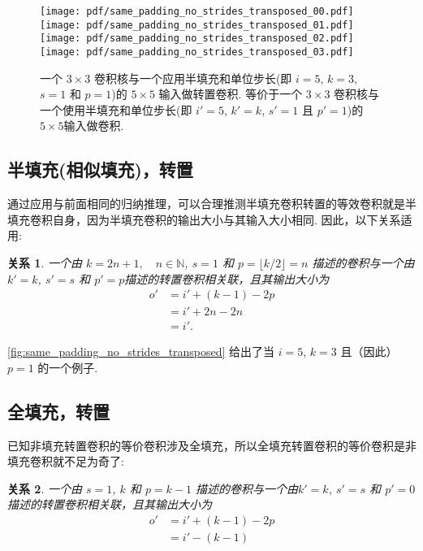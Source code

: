 \documentclass[notitlepage]{ctexrep}
\newtheorem{relationship}{关系}
\begin{document}
\begin{figure}[p]
    \centering
    \texttt{[image: pdf/same\_padding\_no\_strides\_transposed\_00.pdf]}
    \texttt{[image: pdf/same\_padding\_no\_strides\_transposed\_01.pdf]}
    \texttt{[image: pdf/same\_padding\_no\_strides\_transposed\_02.pdf]}
    \texttt{[image: pdf/same\_padding\_no\_strides\_transposed\_03.pdf]}
    \caption{\label{fig:same_padding_no_strides_transposed} 
    一个 $3 \times 3$ 卷积核与一个应用半填充和单位步长(即 $i = 5$, $k = 3$, $s = 1$ 和 $p = 1$)的 $5 \times 5$ 输入做转置卷积. 等价于一个 $3 \times 3$ 卷积核与一个使用半填充和单位步长(即 $i' = 5$, $k' = k$, $s' = 1$ 且 $p' = 1$)的$5 \times 5$输入做卷积.}
\end{figure}

\subsection{半填充(相似填充)，转置}

通过应用与前面相同的归纳推理，可以合理推测半填充卷积转置的等效卷积就是半填充卷积自身，因为半填充卷积的输出大小与其输入大小相同. 因此，以下关系适用:

\begin{relationship}\label{rel:half_padding_no_strides_transposed}
一个由 $k = 2n + 1, \quad n \in \mathbb{N}$, $s = 1$ 和 $p
= \lfloor k / 2 \rfloor = n$ 描述的卷积与一个由 $k' = k$, $s' = s$ 和 $p' = p$描述的转置卷积相关联，且其输出大小为 
\begin{equation*}
\begin{split}
    o' &= i' + (k - 1) - 2p \\
       &= i' + 2n - 2n \\
       &= i'.
\end{split}
\end{equation*}
\end{relationship}

\autoref{fig:same_padding_no_strides_transposed} 给出了当 $i =
5$, $k = 3$ 且（因此） $p = 1$ 的一个例子.

\subsection{全填充，转置}

已知非填充转置卷积的等价卷积涉及全填充，所以全填充转置卷积的等价卷积是非填充卷积就不足为奇了:

\begin{relationship}\label{rel:full_padding_no_strides_transposed}
一个由 $s = 1$, $k$ 和 $p = k - 1$ 描述的卷积与一个由$k' = k$, $s' = s$ 和 $p' = 0$描述的转置卷积相关联，且其输出大小为 
\begin{equation*}
\begin{split}
    o' &= i' + (k - 1) - 2p \\
       &= i' - (k - 1)
\end{split}
\end{equation*}
\end{relationship}
\end{document}
